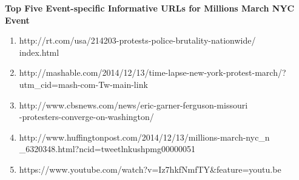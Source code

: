\textbf{Top Five Event-specific Informative URLs for Millions March NYC Event}
\begin{enumerate}
\item http://rt.com/usa/214203-protests-police-brutality-nationwide/\\index.html
\item http://mashable.com/2014/12/13/time-lapse-new-york-protest-march/?utm\_cid=mash-com-Tw-main-link
\item http://www.cbsnews.com/news/eric-garner-ferguson-missouri\\-protesters-converge-on-washington/
\item http://www.huffingtonpost.com/2014/12/13/millions-march-nyc\_n\\\_6320348.html?ncid=tweetlnkushpmg00000051 
\item https://www.youtube.com/watch?v=Iz7hkfNmfTY\&feature=youtu.be                                                                                                                                                                                                                                                                                                                                                                                                                                                                                           
\end{enumerate}



